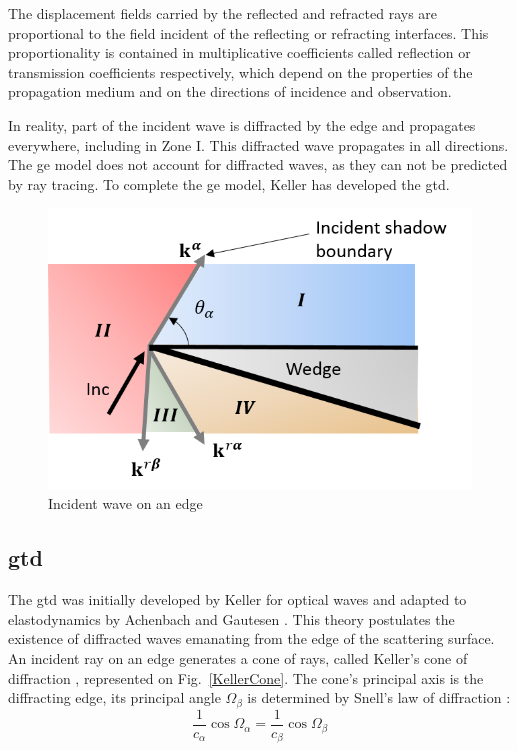 The displacement fields carried by the reflected and refracted rays are proportional to the field incident of the reflecting or refracting interfaces. This proportionality is contained in multiplicative coefficients called reflection or transmission coefficients respectively, which depend on the properties of the propagation medium and on the directions of incidence and observation.

In reality, part of the incident wave is diffracted by the edge and propagates everywhere, including in Zone I. This diffracted wave propagates in all directions. The \acrshort{ge} model does not account for diffracted waves, as they can not be predicted by ray tracing. To complete the \acrshort{ge} model, Keller \cite{GTD} has developed the \acrfull{gtd}.

\begin{figure}
    \centering
    \includegraphics[height=0.33\textheight]{images/chapter1/ShadowBoundary.png}
    \caption{Incident wave on an edge}
    \label{illuzones}
\end{figure}

\subsection{\acrfull{gtd}}
\label{C1:GTD}
The \acrfull{gtd} was initially developed by Keller \cite{GTD} for optical waves and adapted to elastodynamics by Achenbach and Gautesen \cite{AchenbachGautesen, Achenbach}. This theory postulates the existence of diffracted waves emanating from the edge of the scattering surface. An incident ray on an edge generates a cone of rays, called Keller's cone of diffraction \cite{GTD}, represented on Fig.~\ref{KellerCone}. The cone's principal axis is the diffracting edge, its principal angle $\Omega_{\beta}$ is determined by Snell's law of diffraction :
\begin{equation}
    \frac{1}{c_{\alpha}}\cos\Omega_{\alpha} = \frac{1}{c_{\beta}} \cos\Omega_{\beta}
    \label{Snelldiff}
\end{equation}

